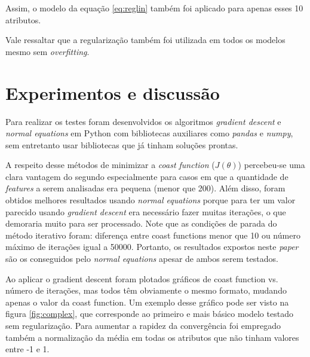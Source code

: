 \documentclass[10pt,twocolumn,letterpaper]{article}
\begin{document}
Assim, o modelo da equação \ref{eq:reglin} também foi aplicado para apenas esses 10 atributos.

Vale ressaltar que a regularização também foi utilizada em todos os modelos mesmo sem \textit{overfitting}.

\section{Experimentos e discussão}

Para realizar os testes foram desenvolvidos os algoritmos \textit{gradient descent} e \textit{normal equations} em Python com bibliotecas auxiliares como \textit{pandas} e \textit{numpy}, sem entretanto usar bibliotecas que já tinham soluções prontas.

A respeito desse métodos de minimizar a \textit{coast function} ($J(\theta)$) percebeu-se uma clara vantagem do segundo especialmente para casos em que a quantidade de \textit{features} a serem analisadas era pequena (menor que 200). Além disso, foram obtidos melhores resultados usando \textit{normal equations} porque para ter um valor parecido usando \textit{gradient descent} era necessário fazer muitas iterações, o que demoraria muito para ser processado. Note que as condições de parada do método iterativo foram: diferença entre coast functions menor que 10 ou número máximo de iterações igual a 50000. Portanto, os resultados expostos neste \textit{paper} são os conseguidos pelo \textit{normal equations} apesar de ambos serem testados.

Ao aplicar o gradient descent foram plotados gráficos de coast function vs. número de iterações, mas todos têm obviamente o mesmo formato, mudando apenas o valor da coast function. Um exemplo desse gráfico pode ser visto na figura \ref{fig:complex}, que corresponde ao primeiro e mais básico modelo testado sem regularização. Para aumentar a rapidez da convergência foi empregado também a normalização da média em todas os atributos que não tinham valores entre -1 e 1.
\end{document}
